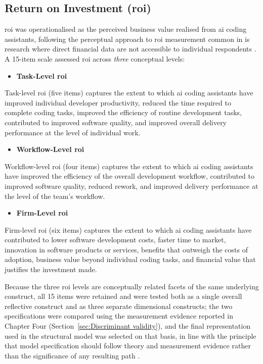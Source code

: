 \subsection{Return on Investment (\gls{roi})}
\label{sec:Return on Investment Measurement}
\gls{roi} was operationalised as the perceived business value realised from \gls{ai} coding assistants, following the perceptual approach to \gls{roi} measurement common in \gls{is} research where direct financial data are not accessible to individual respondents \autocite{Hair2019}. A 15-item scale assessed \gls{roi} across \textit{three} conceptual levels:

\begin{itemize}
	\item \textbf{Task-Level \gls{roi}}
\end{itemize}
Task-level \gls{roi} (five items) captures the extent to which \gls{ai} coding assistants have improved individual developer productivity, reduced the time required to complete coding tasks, improved the efficiency of routine development tasks, contributed to improved software quality, and improved overall delivery performance at the level of individual work.

\begin{itemize}
	\item \textbf{Workflow-Level \gls{roi}}
\end{itemize}
Workflow-level \gls{roi} (four items) captures the extent to which \gls{ai} coding assistants have improved the efficiency of the overall development workflow, contributed to improved software quality, reduced rework, and improved delivery performance at the level of the team's workflow.

\begin{itemize}
	\item \textbf{Firm-Level \gls{roi}}
\end{itemize}
Firm-level \gls{roi} (six items) captures the extent to which \gls{ai} coding assistants have contributed to lower software development costs, faster time to market, innovation in software products or services, benefits that outweigh the costs of adoption, business value beyond individual coding tasks, and financial value that justifies the investment made.

Because the three \gls{roi} levels are conceptually related facets of the same underlying construct, all 15 items were retained and were tested both as a single overall reflective construct and as three separate dimensional constructs; the two specifications were compared using the measurement evidence reported in Chapter Four (Section~\ref{sec:Discriminant validity}), and the final representation used in the structural model was selected on that basis, in line with the principle that model specification should follow theory and measurement evidence rather than the significance of any resulting path \autocite{Hair2019}.

